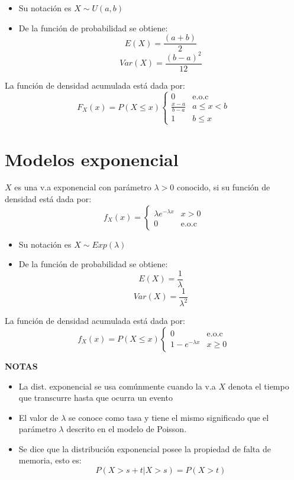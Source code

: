 \documentclass[12pt,twocolumn,a4paper]{report}
\begin{document}
\begin{itemize}
\setlength\itemsep{0.001cm}
\item{Su notación es $X \sim U(a,b)$}
\item{De la función de probabilidad se obtiene:
$$
E(X) = \frac{(a+b)}{2}
$$
$$
Var(X) = \frac{(b-a)^2}{12}
$$}
\end{itemize}

La función de densidad acumulada está dada por:
\begin{equation*}
F_X(x) = P(X \leq x) \left\{ \begin{array}{lc}
             0 & \text{e.o.c} \\
          	 \frac{x-a}{b-a} & a \leq x < b \\ 
          	 1 & b \leq x 
             \end{array}
   \right.
\end{equation*}

\section*{Modelos exponencial}
$X$ es una v.a exponencial con parámetro $\lambda > 0$ conocido, si su función de densidad está dada por:
\begin{equation*}
f_X(x)= \left\{ \begin{array}{lc}
             \lambda e^{-\lambda x} & x > 0\\
             0			   & \text{e.o.c} 
             \end{array}
   \right.
\end{equation*}
\begin{itemize}
\setlength\itemsep{0.001cm}
\item{Su notación es $X \sim Exp(\lambda)$}
\item{De la función de probabilidad se obtiene:
$$
E(X) = \frac{1}{\lambda}
$$
$$
Var(X) = \frac{1}{\lambda ^2}
$$}
\end{itemize}

La función de densidad acumulada está dada por: 
\begin{equation*}
f_X(x)= P(X \leq x)\left\{ \begin{array}{lc}
            0  & \text{e.o.c}\\
             1 - e^{-\lambda x} & x \geq 0
             \end{array}
   \right.
\end{equation*}

\textbf{NOTAS}
\begin{itemize}
\setlength\itemsep{0.001cm}
\item{La dist. exponencial se usa comúnmente cuando la v.a $X$ denota el tiempo que transcurre hasta que ocurra un evento}
\item{El valor de $\lambda$ se conoce como tasa y tiene el mismo significado que el parámetro $\lambda $ descrito en el modelo de Poisson.}
\item{Se dice que la distribución exponencial posee la propiedad de falta de memoria, esto es:
$$
P(X > s+t | X > s) = P(X>t)
$$
}
\end{itemize}
\end{document}
